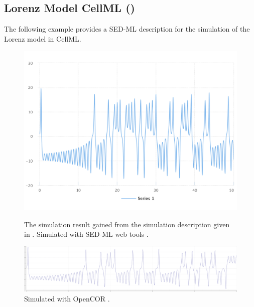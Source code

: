 
\subsection{Lorenz Model CellML ()}
\label{example:lorenz_cellml}
The following example provides a SED-ML description for the simulation of the Lorenz model in CellML.

\begin{figure}[ht]
    \centering
    \begin{minipage}{0.47\textwidth}
        \centering
        \includegraphics[width=1.0\textwidth]{examples/lorenz-cellml/results/sedml_webtools/plot1}
        \caption{The simulation result gained from the simulation description given in . Simulated with SED-ML web tools \citep{bergmann2017sed}.}
    \end{minipage}\hfill
    \begin{minipage}{0.47\textwidth}
        \centering
        \includegraphics[width=1.0\textwidth]{examples/lorenz-cellml/results/opencor/plot1}
        \caption{Simulated with OpenCOR \citep{garny2015opencor}.}
    \end{minipage}
    \label{fig:lorenz-cellml}
\end{figure}

